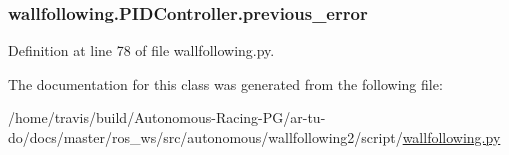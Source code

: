\subsubsection[{\texorpdfstring{previous\+\_\+error}{previous_error}}]{\setlength{\rightskip}{0pt plus 5cm}wallfollowing.\+P\+I\+D\+Controller.\+previous\+\_\+error}\hypertarget{classwallfollowing_1_1_p_i_d_controller_a8f880f52e6d6f020769ab01d6459c908}{}\label{classwallfollowing_1_1_p_i_d_controller_a8f880f52e6d6f020769ab01d6459c908}


Definition at line 78 of file wallfollowing.\+py.



The documentation for this class was generated from the following file\+:\begin{DoxyCompactItemize}
\item 
/home/travis/build/\+Autonomous-\/\+Racing-\/\+P\+G/ar-\/tu-\/do/docs/master/ros\+\_\+ws/src/autonomous/wallfollowing2/script/\hyperlink{wallfollowing_8py}{wallfollowing.\+py}\end{DoxyCompactItemize}
